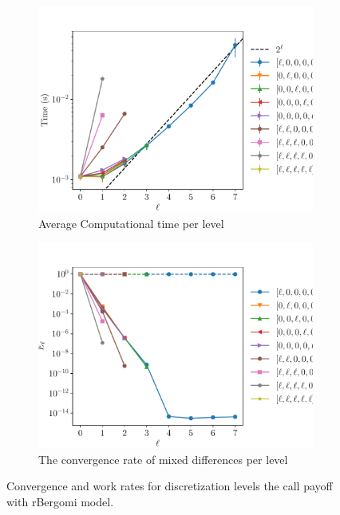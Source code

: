 \documentclass[11pt]{article}
\begin{document}
\begin{figure}[!h]
	\centering
	\begin{subfigure}{.5\textwidth}
		\centering
		\includegraphics[width=0.95\linewidth]{./figures/rbergomi_16_steps_K_e__4/level_work.pdf}
		\caption{Average Computational time per level}
		\label{fig:misc_rbergomi_16_steps_sub3}
	\end{subfigure}%
	\begin{subfigure}{.5\textwidth}
		\centering
		\includegraphics[width=0.95\linewidth]{./figures/rbergomi_16_steps_K_e__4/levels_error_rate.pdf}
		\caption{  The convergence rate of mixed differences per level}
		\label{fig:misc_rbergomi_16_steps_sub4}
	\end{subfigure}%
	\caption{Convergence and work rates for discretization levels  the call payoff with rBergomi model.}
	\label{fig:misc_rbergomi_16_steps_2}
\end{figure}
\end{document}
